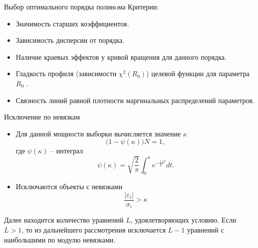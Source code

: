 \documentclass{beamer}
\begin{document}
\begin{frame}{Выбор оптимального порядка полинoма}
	Критерии:
	\begin{itemize}
		\item Значимость старших коэффициентов.
		\item Зависимость дисперсии от порядка.
		\item Наличие краевых эффектов у кривой вращения для данного порядка.
                \item Гладкость профиля (зависимости $\chi^2(R_0)$) целевой функции для параметра $R_0$ .
                \item Связность линий равной плотности маргинальных распределений параметров.
	\end{itemize}
\end{frame}

\begin{frame}{Исключение по невязкам}
	\begin{itemize}
		\item Для данной мощности выборки вычисляется значение $\kappa$
			\begin{equation}
				\big(1 - \psi(\kappa)\big) N = 1,
			\end{equation}
			где $\psi(\kappa)$ -- интеграл
			\begin{equation}
				\psi(\kappa) = \sqrt{\frac{2}{\pi}} \int^{\kappa}_{0} e^{-\frac{1}{2}t^2} dt.
			\end{equation}
		\item Исключаются объекты с невязками
			\begin{equation}
				\frac{| \varepsilon_i |}{\sigma_i} > \kappa
			\end{equation}
	\end{itemize}
Далее находится количество уравнений $L$, удовлетворяющих условию. Если $L > 1$, то из дальнейшего рассмотрения исключается $L - 1$ уравнений с наибольшими по модулю невязками. 
\end{frame}
\end{document}
